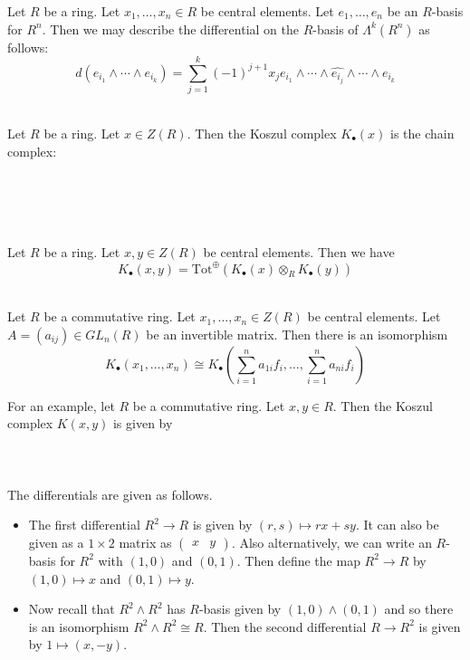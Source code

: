 \documentclass[a4paper]{article}
\begin{document}
Let $R$ be a ring. Let $x_1,\dots,x_n\in R$ be central elements. Let $e_1,\dots,e_n$ be an $R$-basis for $R^n$. Then we may describe the differential on the $R$-basis of $\Lambda^k(R^n)$ as follows: $$d(e_{i_1}\wedge\cdots\wedge e_{i_k})=\sum_{j=1}^k(-1)^{j+1}x_je_{i_1}\wedge\cdots\wedge\widehat{e_{i_j}}\wedge\cdots\wedge e_{i_k}$$

\begin{eg}{}{}\\
Let $R$ be a ring. Let $x\in Z(R)$. Then the Koszul complex $K_\bullet(x)$ is the chain complex: \\~\\
 \\~\\
\end{eg}

\begin{lmm}{}{}\\
Let $R$ be a ring. Let $x,y\in Z(R)$ be central elements. Then we have $$K_\bullet(x,y)=\text{Tot}^\oplus\left(K_\bullet(x)\otimes_R K_\bullet(y)\right)$$
\end{lmm}

\begin{lmm}{}{}\\
Let $R$ be a commutative ring. Let $x_1,\dots,x_n\in Z(R)$ be central elements. Let $A=(a_{ij})\in GL_n(R)$ be an invertible matrix. Then there is an isomorphism $$K_\bullet(x_1,\dots,x_n)\cong K_\bullet\left(\sum_{i=1}^na_{1i}f_i,\dots,\sum_{i=1}^na_{ni}f_i\right)$$
\end{lmm}

For an example, let $R$ be a commutative ring. Let $x,y\in R$. Then the Koszul complex $K(x,y)$ is given by \\~\\
\\~\\
The differentials are given as follows. 
\begin{itemize}
\item The first differential $R^2\to R$ is given by $(r,s)\mapsto rx+sy$. It can also be given as a $1\times 2$ matrix as $\begin{pmatrix}x & y\end{pmatrix}$. Also alternatively, we can write an $R$-basis for $R^2$ with $(1,0)$ and $(0,1)$. Then define the map $R^2\to R$ by $(1,0)\mapsto x$ and $(0,1)\mapsto y$. 
\item Now recall that $R^2\wedge R^2$ has $R$-basis given by $(1,0)\wedge(0,1)$ and so there is an isomorphism $R^2\wedge R^2\cong R$. Then the second differential $R\to R^2$ is given by $1\mapsto(x,-y)$. 
\end{itemize}
\end{document}
